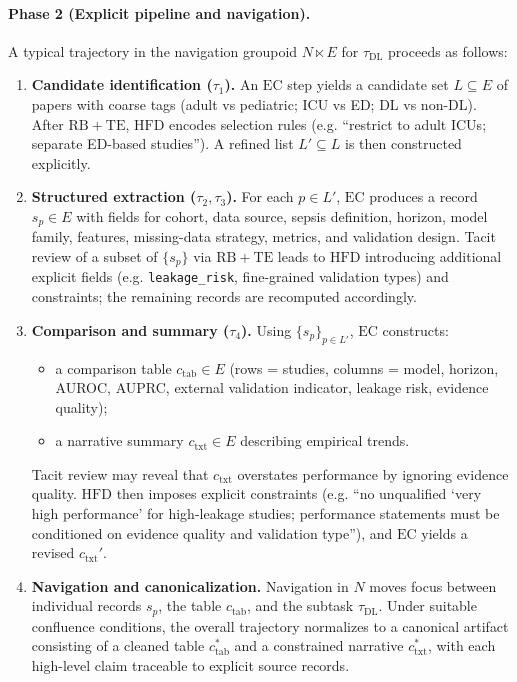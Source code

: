 \paragraph{Phase 2 (Explicit pipeline and navigation).}
A typical trajectory in the navigation groupoid \(N \ltimes E\) for \(\tau_{\mathrm{DL}}\) proceeds as follows:
\begin{enumerate}
  \item \textbf{Candidate identification (\(\tau_1\)).}
  An \(\mathrm{EC}\) step yields a candidate set \(L \subseteq E\) of papers with coarse tags (adult vs pediatric; ICU vs ED; DL vs non-DL). After \(\mathrm{RB}+\mathrm{TE}\), \(\mathrm{HFD}\) encodes selection rules (e.g. ``restrict to adult ICUs; separate ED-based studies''). A refined list \(L' \subseteq L\) is then constructed explicitly.
  \item \textbf{Structured extraction (\(\tau_2,\tau_3\)).}
  For each \(p \in L'\), \(\mathrm{EC}\) produces a record \(s_p \in E\) with fields for cohort, data source, sepsis definition, horizon, model family, features, missing-data strategy, metrics, and validation design. Tacit review of a subset of \(\{s_p\}\) via \(\mathrm{RB}+\mathrm{TE}\) leads to \(\mathrm{HFD}\) introducing additional explicit fields (e.g. \verb|leakage_risk|, fine-grained validation types) and constraints; the remaining records are recomputed accordingly.
  \item \textbf{Comparison and summary (\(\tau_4\)).}
  Using \(\{s_p\}_{p \in L'}\), \(\mathrm{EC}\) constructs:
  \begin{itemize}
    \item a comparison table \(c_{\mathrm{tab}} \in E\) (rows = studies, columns = model, horizon, AUROC, AUPRC, external validation indicator, leakage risk, evidence quality);
    \item a narrative summary \(c_{\mathrm{txt}} \in E\) describing empirical trends.
  \end{itemize}
  Tacit review may reveal that \(c_{\mathrm{txt}}\) overstates performance by ignoring evidence quality. \(\mathrm{HFD}\) then imposes explicit constraints (e.g. ``no unqualified `very high performance' for high-leakage studies; performance statements must be conditioned on evidence quality and validation type''), and \(\mathrm{EC}\) yields a revised \(c_{\mathrm{txt}}'\).
  \item \textbf{Navigation and canonicalization.}
  Navigation in \(N\) moves focus between individual records \(s_p\), the table \(c_{\mathrm{tab}}\), and the subtask \(\tau_{\mathrm{DL}}\). Under suitable confluence conditions, the overall trajectory normalizes to a canonical artifact consisting of a cleaned table \(c_{\mathrm{tab}}^\ast\) and a constrained narrative \(c_{\mathrm{txt}}^\ast\), with each high-level claim traceable to explicit source records.
\end{enumerate}

